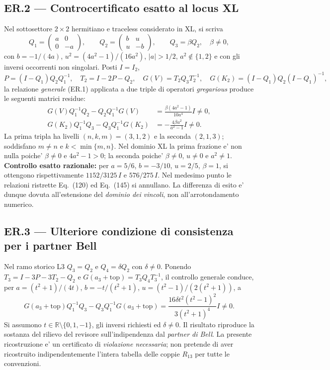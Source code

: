 \documentclass[11pt,a4paper]{article}
\begin{document}
\subsection*{ER.2 --- Controcertificato esatto al locus XL}
Nel sottosettore $2\times 2$ hermitiano e traceless considerato in XL,
si scriva
\begin{equation}
Q_1=\begin{pmatrix}a&0\\0&-a\end{pmatrix},\qquad
Q_2=\begin{pmatrix}b&u\\u&-b\end{pmatrix},\qquad
Q_3=\beta Q_2,\quad \beta\ne0,\tag{ER.3}
\end{equation}
con $b=-1/(4a)$, $u^2=(4a^2-1)/(16a^2)$, $|a|>1/2$,
$a^2\notin\{1,2\}$ e con gli inversi occorrenti non singolari.
Posti $I=I_2$,
\begin{equation}
 P=(I-Q_1)Q_2Q_1^{-1},\quad T_2=I-2P-Q_2,\quad
 G(V)=T_2Q_3T_2^{-1},\quad G(K_2)=(I-Q_1)Q_2(I-Q_1)^{-1},
 \tag{ER.4}
\end{equation}
la relazione \emph{generale} (ER.1) applicata a due triple di operatori
\emph{gregarious} produce le seguenti matrici residue:
\begin{align}
 G(V)Q_1^{-1}Q_2-Q_2Q_1^{-1}G(V)
   &=\frac{\beta(4a^2-1)}{10a^4}I\ne0,\tag{ER.5}\\
 G(K_2)Q_1^{-1}Q_3-Q_3Q_1^{-1}G(K_2)
   &=-\frac{4\beta u^2}{a^2-1}I\ne0.\tag{ER.6}
\end{align}
La prima tripla ha livelli $(n,k,m)=(3,1,2)$ e la seconda $(2,1,3)$;
soddisfano $m\ne n$ e $k<\min\{m,n\}$. Nel dominio XL la prima frazione
e' non nulla poiche' $\beta\ne0$ e $4a^2-1>0$; la seconda poiche'
$\beta\ne0$, $u\ne0$ e $a^2\ne1$.
\textbf{Controllo esatto razionale:} per $a=5/6$, $b=-3/10$,
$u=2/5$, $\beta=1$, si ottengono rispettivamente
$1152/3125\,I$ e $576/275\,I$. Nel medesimo punto le relazioni
ristrette Eq.~(120) ed Eq.~(145) si annullano. La differenza di esito
e' dunque dovuta all'estensione del \emph{dominio dei vincoli}, non
all'arrotondamento numerico.

\clearpage
\subsection*{ER.3 --- Ulteriore condizione di consistenza per i partner Bell}
Nel ramo storico L3 $Q_3=Q_2$ e $Q_4=\delta Q_2$ con $\delta\ne0$.
Ponendo $T_3=I-3P-3T_2-Q_2$ e
$G(a_3+\mathrm{top})=T_3Q_4T_3^{-1}$, il controllo generale conduce,
per $a=(t^2+1)/(4t)$, $b=-t/(t^2+1)$,
$u=(t^2-1)/(2(t^2+1))$, a
\begin{equation}
 G(a_3+\mathrm{top})Q_1^{-1}Q_3
 -Q_3Q_1^{-1}G(a_3+\mathrm{top})
 =\frac{16\delta t^2(t^2-1)^2}{3(t^2+1)^4}I\ne0.
 \tag{ER.7}
\end{equation}
Si assumono $t\in\mathbb R\setminus\{0,1,-1\}$, gli inversi richiesti
ed $\delta\ne0$. Il risultato riproduce la sostanza del rilievo del
revisore sull'indipendenza dal \emph{partner di Bell}. La presente
ricostruzione e' un certificato di \emph{violazione necessaria}; non
pretende di aver ricostruito indipendentemente l'intera tabella delle
coppie $R_{13}$ per tutte le convenzioni.
\end{document}
